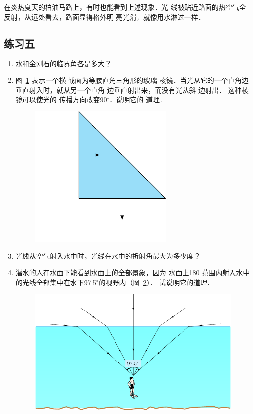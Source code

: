在炎热夏天的柏油马路上，有时也能看到上述现象．光
线被贴近路面的热空气全反射，从远处看去，路面显得格外明
亮光滑，就像用水淋过一样．

\subsection*{练习五}

\begin{enumerate}
    \item 水和金刚石的临界角各是多大？
    \item \label{exe_C_5-5.2} 图~\ref{fig_C_5-29} 表示一个横
截面为等腰直角三角形的玻璃
棱镜．当光从它的一个直角边垂直射入时，就从另一个直角
边垂直射出来，而没有光从斜
边射出．
这种棱镜可以使光的
传播方向改变90$^\circ$．说明它的
道理．
\begin{figure}[htbp]
    \centering
    \includegraphics{fig/C/5-29.pdf}
    \caption{}\label{fig_C_5-29}
\end{figure}

\item 光线从空气射入水中时，光线在水中的折射角最大为多少度？
\item 潜水的人在水面下能看到水面上的全部景象，因为
水面上180$^\circ$范围内射入水中的光线全部集中在水下97.5$^\circ$的视野内（图~\ref{fig_C_5-30}）．
试说明它的道理．
\begin{figure}[htbp]
    \centering
    \includegraphics{fig/C/5-30.pdf}
    \caption{}\label{fig_C_5-30}
\end{figure}
\end{enumerate}

